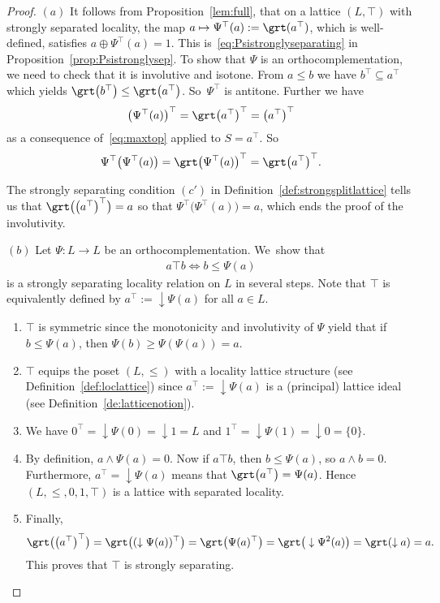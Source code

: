 \documentclass[10pt,a4paper]{amsart}
\numberwithin{equation}{section}
\newcommand{\loc}{locality\xspace}
\newcommand{\pone}{separating\xspace }
\def \ptwob {separated\xspace }
\begin{document}
\begin{proof}
$(a)$
It follows from Proposition~\ref{lem:full}, that on a lattice $(L, \top)$ with strongly \ptwob \loc, the map $a\mapsto \Psi^\top(a):=\grt (a^\top)$, which is well-defined, satisfies $a\oplus \Psi^\top(a)= 1$. This is~\eqref{eq:Psistronglyseparating} in Proposition~\ref{prop:Psistronglysep}. To show that $\Psi$ is an orthocomplementation, we need to check that it is involutive and isotone. From $a\leq b$ we have $b^\top\subseteq a^\top$ which yields $\grt \big(b^\top\big)\leq\grt \big(a^\top\big)$. So~$\Psi^\top$ is antitone. Further we have
\begin{gather*}
\big(\Psi^\top(a)\big)^\top=\grt\big(a^\top\big)^\top=\big(a^\top\big)^\top
\end{gather*}
as a consequence of~\eqref{eq:maxtop} applied to $S=a^\top$. So
\begin{gather*}
\Psi^\top\big(\Psi^\top(a)\big)=\grt\big(\Psi^\top(a)\big)^\top=\grt \big(a^\top\big)^\top.
\end{gather*}

The strongly separating condition $(c')$ in Definition~\ref{def:strongsplitlattice} tells us that
$\grt\big(\big(a^\top\big)^\top\big)= a$ so that
$\Psi^\top\big(\Psi^\top(a)\big)=a$, which ends the proof of the involutivity.


$(b)$ %
Let $\Psi\colon L\to L$ be an orthocomplementation. We~show that
\begin{gather*}
a\top b\Longleftrightarrow b\leq \Psi(a)
\end{gather*}
is a strongly \pone \loc relation on $L$ in several steps. Note that $\top$ is equivalently defined by $a^\top:=\downarrow\Psi(a)$ for all $a\in L$.
\begin{enumerate}\itemsep=0pt
	\item[(1)] $\top$ is symmetric since the monotonicity and involutivity of $\Psi$ yield that if $b\leq \Psi(a)$, then $ \Psi(b)\geq \Psi(\Psi(a))=a$.
	\item[(2)] $\top$ equips the poset $(L, \leq)$ with a \loc lattice structure (see Definition~\ref{def:loclattice}) since $a^\top:=\downarrow\Psi(a)$ is a (principal) lattice ideal (see Definition~\ref{de:latticenotion}).
	\item[(3)] We have $0^\top=\downarrow \Psi(0)=\downarrow 1=L$ and $1^\top =\downarrow \Psi(1)=\downarrow 0=\{0\}$.
	\item[(4)] By definition, $a\wedge \Psi (a)=0$. Now if $a\top b$, then $b\le \Psi (a)$, so $a \wedge b=0$. Furthermore, $a^\top = \downarrow \Psi(a)$ means that $\grt\big(a^\top\big)=\Psi(a)$. Hence $(L,\leq, 0, 1,\top)$ is a lattice with separated \loc.
	\item[(5)] Finally,
\begin{gather*}
\grt\big(\big(a^\top\big)^\top\big) = \grt\big( (\downarrow \Psi(a))^\top\big) =\grt\big( \Psi(a)^\top\big) =\grt \big( \downarrow \Psi^2(a)\big) = \grt (\downarrow a)=a.
\end{gather*}
This proves that $\top$ is strongly separating.
\end{enumerate}



\end{proof}
\end{document}
